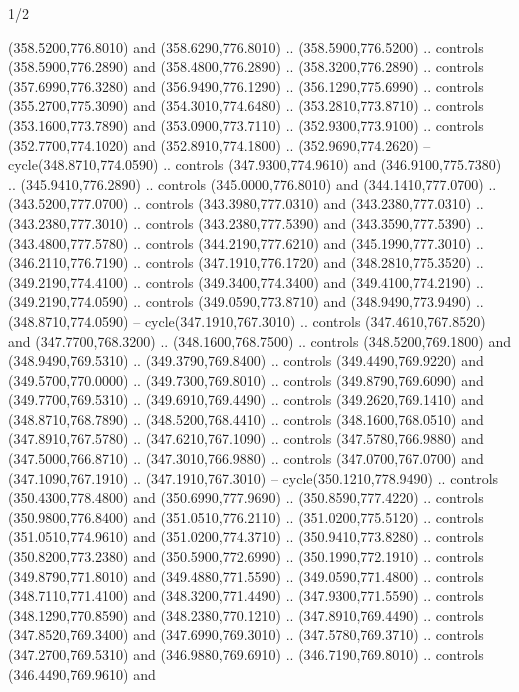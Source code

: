 \begin{flagdescription}{1/2}
\begin{scope}[xshift=0.5\flaglength]
\begin{scope}[scale=0.00745\flagwidth,xshift=-12.1mm,yshift=41.7mm]
\begin{scope}[y=0.80pt, x=0.80pt, yscale=-1, xscale=1, inner sep=0pt, outer sep=0pt]
\begin{scope}[cm={{1.33333,0.0,0.0,-1.33333,(0.0,114.66667)}}]
\begin{scope}[scale=0.100]
  (358.5200,776.8010) and (358.6290,776.8010) .. (358.5900,776.5200) .. controls
  (358.5900,776.2890) and (358.4800,776.2890) .. (358.3200,776.2890) .. controls
  (357.6990,776.3280) and (356.9490,776.1290) .. (356.1290,775.6990) .. controls
  (355.2700,775.3090) and (354.3010,774.6480) .. (353.2810,773.8710) .. controls
  (353.1600,773.7890) and (353.0900,773.7110) .. (352.9300,773.9100) .. controls
  (352.7700,774.1020) and (352.8910,774.1800) .. (352.9690,774.2620) --
  cycle(348.8710,774.0590) .. controls (347.9300,774.9610) and
  (346.9100,775.7380) .. (345.9410,776.2890) .. controls (345.0000,776.8010) and
  (344.1410,777.0700) .. (343.5200,777.0700) .. controls (343.3980,777.0310) and
  (343.2380,777.0310) .. (343.2380,777.3010) .. controls (343.2380,777.5390) and
  (343.3590,777.5390) .. (343.4800,777.5780) .. controls (344.2190,777.6210) and
  (345.1990,777.3010) .. (346.2110,776.7190) .. controls (347.1910,776.1720) and
  (348.2810,775.3520) .. (349.2190,774.4100) .. controls (349.3400,774.3400) and
  (349.4100,774.2190) .. (349.2190,774.0590) .. controls (349.0590,773.8710) and
  (348.9490,773.9490) .. (348.8710,774.0590) -- cycle(347.1910,767.3010) ..
  controls (347.4610,767.8520) and (347.7700,768.3200) .. (348.1600,768.7500) ..
  controls (348.5200,769.1800) and (348.9490,769.5310) .. (349.3790,769.8400) ..
  controls (349.4490,769.9220) and (349.5700,770.0000) .. (349.7300,769.8010) ..
  controls (349.8790,769.6090) and (349.7700,769.5310) .. (349.6910,769.4490) ..
  controls (349.2620,769.1410) and (348.8710,768.7890) .. (348.5200,768.4410) ..
  controls (348.1600,768.0510) and (347.8910,767.5780) .. (347.6210,767.1090) ..
  controls (347.5780,766.9880) and (347.5000,766.8710) .. (347.3010,766.9880) ..
  controls (347.0700,767.0700) and (347.1090,767.1910) .. (347.1910,767.3010) --
  cycle(350.1210,778.9490) .. controls (350.4300,778.4800) and
  (350.6990,777.9690) .. (350.8590,777.4220) .. controls (350.9800,776.8400) and
  (351.0510,776.2110) .. (351.0200,775.5120) .. controls (351.0510,774.9610) and
  (351.0200,774.3710) .. (350.9410,773.8280) .. controls (350.8200,773.2380) and
  (350.5900,772.6990) .. (350.1990,772.1910) .. controls (349.8790,771.8010) and
  (349.4880,771.5590) .. (349.0590,771.4800) .. controls (348.7110,771.4100) and
  (348.3200,771.4490) .. (347.9300,771.5590) .. controls (348.1290,770.8590) and
  (348.2380,770.1210) .. (347.8910,769.4490) .. controls (347.8520,769.3400) and
  (347.6990,769.3010) .. (347.5780,769.3710) .. controls (347.2700,769.5310) and
  (346.9880,769.6910) .. (346.7190,769.8010) .. controls (346.4490,769.9610) and

\end{scope}
\end{scope}
\end{scope}
\end{scope}
\end{scope}
\end{flagdescription}
